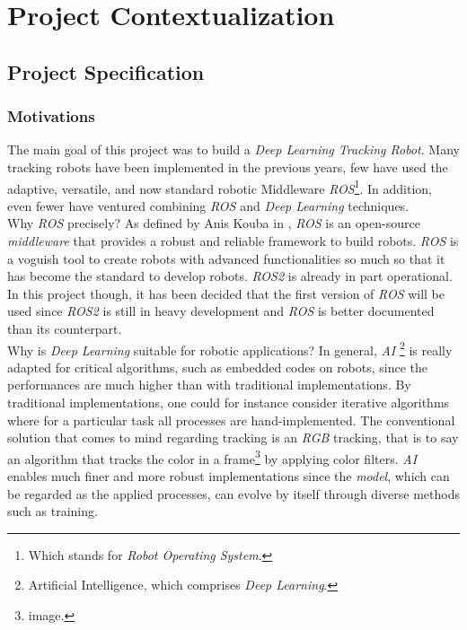 \clearpage
{}

\chapter{Project Contextualization}

	\section{Project Specification}
	
		\subsection{Motivations}
	
		The main goal of this project was to build a \textit{Deep Learning Tracking Robot}. Many tracking
		robots have been implemented in the previous years, few have used the adaptive, versatile, and 
		now standard robotic Middleware \textit{ROS}\footnote{Which stands for \textit{Robot Operating System}.}.
		In addition, even fewer have ventured combining \textit{ROS} and \textit{Deep Learning} techniques.
		\\\indent Why \textit{ROS} precisely? As defined by Anis Kouba in \cite{latexcompanion}, \textit{ROS}
		is an \frstg{} open-source \textit{middleware} \lstg{} that provides a robust and reliable framework 
		to build robots. \textit{ROS} is a voguish tool to create robots with advanced functionalities so much so 
		that it has become the standard to develop robots. \textit{ROS2} is already in part 
		operational. In this project though, 
		it has been decided that the first version of \textit{ROS} will be used since \textit{ROS2} is still 
		in heavy development and \textit{ROS} is better documented than its counterpart.
		\\\indent Why is \textit{Deep Learning} suitable for robotic applications? In general, \textit{AI}
		\footnote{Artificial Intelligence, which comprises \textit{Deep Learning}.}
		is really adapted for critical algorithms, such as embedded codes
		on robots, since the performances are much higher than with traditional implementations. By traditional
		implementations, one could for instance consider iterative algorithms where for a particular task 
		all processes are hand-implemented. The conventional solution 
		that comes to mind regarding tracking is an \textit{RGB} tracking, that is to say an 
		algorithm that tracks the color in a frame\footnote{image.} by applying 
		color filters. \textit{AI} enables much finer and more robust
		implementations since the \textit{model},
		which can be regarded as the applied processes, can evolve by itself through diverse methods such as training.
		 
